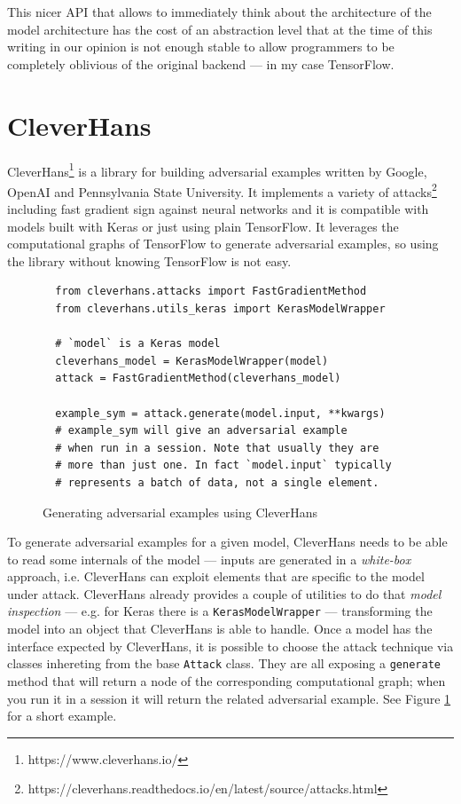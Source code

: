 This nicer API that allows to immediately think about the architecture
of the model
architecture has the cost of an abstraction level that at the time of
this writing in our opinion is not enough stable to allow programmers
to be completely oblivious of the original backend --- in my case
TensorFlow.

\section{CleverHans}
\label{sec:cleverhans}

CleverHans\footnote{https://www.cleverhans.io/} is a library for
building adversarial examples written by Google, OpenAI and
Pennsylvania State University. It implements a variety of
attacks\footnote{https://cleverhans.readthedocs.io/en/latest/source/attacks.html}
including fast gradient sign against neural networks and it is
compatible with models built with Keras or just using plain TensorFlow.
It leverages the computational graphs of TensorFlow to generate
adversarial examples, so using the library without knowing TensorFlow
is not easy.

\begin{figure}
  \begin{verbatim}
  from cleverhans.attacks import FastGradientMethod
  from cleverhans.utils_keras import KerasModelWrapper

  # `model` is a Keras model
  cleverhans_model = KerasModelWrapper(model)
  attack = FastGradientMethod(cleverhans_model)

  example_sym = attack.generate(model.input, **kwargs)
  # example_sym will give an adversarial example
  # when run in a session. Note that usually they are
  # more than just one. In fact `model.input` typically
  # represents a batch of data, not a single element.
  \end{verbatim}
  \caption{Generating adversarial examples using CleverHans}
  \label{fig:cleverhans-attack-dot-generate}
\end{figure}

To generate adversarial examples for a given model, CleverHans needs to
be able to read some internals of the model --- inputs are generated in
a \emph{white-box} approach, i.e. CleverHans can exploit elements that
are specific to the model under attack. CleverHans already provides a
couple of utilities to do that \emph{model inspection} --- e.g. for
Keras there is a \texttt{KerasModelWrapper} --- transforming the model
into an object that CleverHans is able to handle. Once a model has the
interface expected by CleverHans, it is possible to choose the attack
technique via classes inhereting from the base \texttt{Attack} class.
They are all exposing a \texttt{generate} method that will return a
node of the corresponding computational graph; when you run it in a
session it will return the related adversarial example. See Figure
\ref{fig:cleverhans-attack-dot-generate} for a short example.

